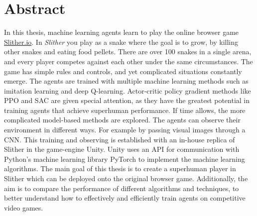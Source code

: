 \section*{Abstract}

In this thesis, machine learning agents learn to play the online browser game \href{https://Slither.io}{Slither.io}. In \textit{Slither} you play as a snake where the goal is to grow, by killing other snakes and eating food pellets. There are over 100 snakes in a single arena, and every player competes against each other under the same circumstances. The game has simple rules and controls, and yet complicated situations constantly emerge. The agents are trained with multiple machine learning methods such as imitation learning and deep Q-learning. Actor-critic policy gradient methods like PPO and SAC are given special attention, as they have the greatest potential in training agents that achieve superhuman performance. If time allows, the more complicated model-based methods are explored. The agents can observe their environment in different ways. For example by passing visual images through a CNN. This training and observing is established with an in-house replica of Slither in the game-engine Unity. Unity uses an API for communication with Python's machine learning library PyTorch to implement the machine learning algorithms. The main goal of this thesis is to create a superhuman player in Slither which can be deployed onto the original browser game.  Additionally, the aim is to compare the performance of different algorithms and techniques, to better understand how to effectively and efficiently train agents on competitive video games.



